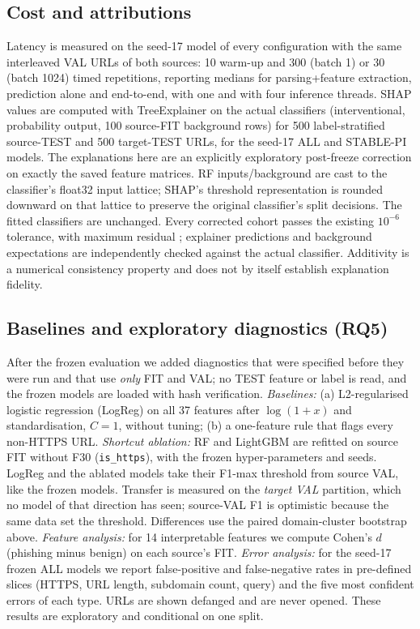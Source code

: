 \subsection{Cost and attributions}
Latency is measured on the seed-17 model of every configuration with the same interleaved VAL URLs of both sources: 10 warm-up and 300 (batch 1) or 30 (batch 1024) timed repetitions, reporting medians for parsing+feature extraction, prediction alone and end-to-end, with one and with four inference threads. SHAP values are computed with TreeExplainer on the actual classifiers (interventional, probability output, 100 source-FIT background rows) for 500 label-stratified source-TEST and 500 target-TEST URLs, for the seed-17 ALL and STABLE-PI models. The explanations here are an explicitly exploratory post-freeze correction on exactly the saved feature matrices. RF inputs/background are cast to the classifier's float32 input lattice; SHAP's threshold representation is rounded downward on that lattice to preserve the original classifier's split decisions. The fitted classifiers are unchanged. Every corrected cohort passes the existing $10^{-6}$ tolerance, with maximum residual ; explainer predictions and background expectations are independently checked against the actual classifier. Additivity is a numerical consistency property and does not by itself establish explanation fidelity.

\subsection{Baselines and exploratory diagnostics (RQ5)}
After the frozen evaluation we added diagnostics that were specified before they were run and that use \emph{only} FIT and VAL; no TEST feature or label is read, and the frozen models are loaded with hash verification. \emph{Baselines:} (a) L2-regularised logistic regression (LogReg) on all 37 features after $\log(1{+}x)$ and standardisation, $C{=}1$, without tuning; (b) a one-feature rule that flags every non-HTTPS URL. \emph{Shortcut ablation:} RF and LightGBM are refitted on source FIT without F30 (\texttt{is\_https}), with the frozen hyper-parameters and seeds. LogReg and the ablated models take their F1-max threshold from source VAL, like the frozen models. Transfer is measured on the \emph{target VAL} partition, which no model of that direction has seen; source-VAL F1 is optimistic because the same data set the threshold. Differences use the paired domain-cluster bootstrap above. \emph{Feature analysis:} for 14 interpretable features we compute Cohen's $d$ (phishing minus benign) on each source's FIT. \emph{Error analysis:} for the seed-17 frozen ALL models we report false-positive and false-negative rates in pre-defined slices (HTTPS, URL length, subdomain count, query) and the five most confident errors of each type. URLs are shown defanged and are never opened. These results are exploratory and conditional on one split.

